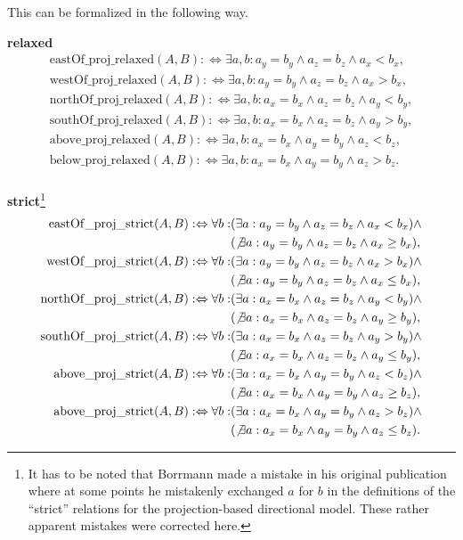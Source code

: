 \documentclass[paper=a4, fontsize=11pt]{scrartcl} %
\numberwithin{equation}{section} %
\numberwithin{figure}{section} %
\numberwithin{table}{section} %
\begin{document}
This can be formalized in the following way. 


\textbf{relaxed}
\begin{align*}
  \mathrm{eastOf\_proj\_relaxed}(A,B) :\Leftrightarrow \exists a,b:a_y=b_y\wedge a_z=b_z\wedge a_x<b_x, \\
  \mathrm{westOf\_proj\_relaxed}(A,B) :\Leftrightarrow \exists a,b:a_y=b_y\wedge a_z=b_z\wedge a_x>b_x, \\
  \mathrm{northOf\_proj\_relaxed}(A,B) :\Leftrightarrow \exists a,b:a_x=b_x\wedge a_z=b_z\wedge a_y<b_y, \\
  \mathrm{southOf\_proj\_relaxed}(A,B) :\Leftrightarrow \exists a,b:a_x=b_x\wedge a_z=b_z\wedge a_y>b_y, \\
  \mathrm{above\_proj\_relaxed}(A,B) :\Leftrightarrow \exists a,b:a_x=b_x\wedge a_y=b_y\wedge a_z<b_z, \\
  \mathrm{below\_proj\_relaxed}(A,B) :\Leftrightarrow \exists a,b:a_x=b_x\wedge a_y=b_y\wedge a_z>b_z. \\
\end{align*}

\textbf{strict}\footnote{It has to be noted that Borrmann made a mistake in his original publication \cite{Borrmann:2009:AEI} where at some points he mistakenly exchanged $a$ for $b$ in the definitions of the ``strict'' relations for the projection-based directional model. These rather apparent mistakes were corrected here.} 
\begin{align*}
  \mathrm{eastOf\_proj\_strict}(A,B) :\Leftrightarrow \forall b:&(\exists a:a_y=b_y\wedge a_z=b_z\wedge a_x<b_x) \wedge \\&(\not\exists a:a_y=b_y\wedge a_z=b_z\wedge a_x\ge b_x), \\
  \mathrm{westOf\_proj\_strict}(A,B) :\Leftrightarrow \forall b:&(\exists a:a_y=b_y\wedge a_z=b_z\wedge a_x>b_x) \wedge \\&(\not\exists a:a_y=b_y\wedge a_z=b_z\wedge a_x\le b_x), \\
  \mathrm{northOf\_proj\_strict}(A,B) :\Leftrightarrow \forall b:&(\exists a:a_x=b_x\wedge a_z=b_z\wedge a_y<b_y) \wedge \\&(\not\exists a:a_x=b_x\wedge a_z=b_z\wedge a_y\ge b_y), \\
 \mathrm{southOf\_proj\_strict}(A,B) :\Leftrightarrow \forall b:&(\exists a:a_x=b_x\wedge a_z=b_z\wedge a_y>b_y) \wedge \\&(\not\exists a:a_x=b_x\wedge a_z=b_z\wedge a_y\le b_y), \\
 \mathrm{above\_proj\_strict}(A,B) :\Leftrightarrow \forall b:&(\exists a:a_x=b_x\wedge a_y=b_y\wedge a_z<b_z) \wedge \\&(\not\exists a:a_x=b_x\wedge a_y=b_y\wedge a_z\ge b_z), \\
 \mathrm{above\_proj\_strict}(A,B) :\Leftrightarrow \forall b:&(\exists a:a_x=b_x\wedge a_y=b_y\wedge a_z>b_z) \wedge \\&(\not\exists a:a_x=b_x\wedge a_y=b_y\wedge a_z\le b_z).
\end{align*}
\end{document}
